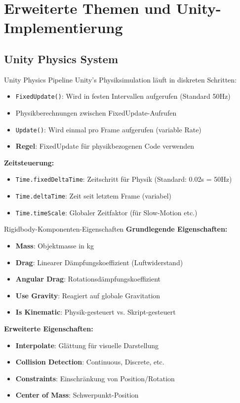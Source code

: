 \section{Erweiterte Themen und Unity-Implementierung}

\subsection{Unity Physics System}

\begin{concept}{Unity Physics Pipeline}
    Unity's Physiksimulation läuft in diskreten Schritten:
    \begin{itemize}
        \item \texttt{FixedUpdate()}: Wird in festen Intervallen aufgerufen (Standard 50Hz)
        \item Physikberechnungen zwischen FixedUpdate-Aufrufen
        \item \texttt{Update()}: Wird einmal pro Frame aufgerufen (variable Rate)
        \item \textbf{Regel}: FixedUpdate für physikbezogenen Code verwenden
    \end{itemize}
    
    \textbf{Zeitsteuerung:}
    \begin{itemize}
        \item \texttt{Time.fixedDeltaTime}: Zeitschritt für Physik (Standard: 0.02s = 50Hz)
        \item \texttt{Time.deltaTime}: Zeit seit letztem Frame (variabel)
        \item \texttt{Time.timeScale}: Globaler Zeitfaktor (für Slow-Motion etc.)
    \end{itemize}
\end{concept}

\begin{definition}{Rigidbody-Komponenten-Eigenschaften}
    \textbf{Grundlegende Eigenschaften:}
    \begin{itemize}
        \item \textbf{Mass}: Objektmasse in kg
        \item \textbf{Drag}: Linearer Dämpfungskoeffizient (Luftwiderstand)
        \item \textbf{Angular Drag}: Rotationsdämpfungskoeffizient
        \item \textbf{Use Gravity}: Reagiert auf globale Gravitation
        \item \textbf{Is Kinematic}: Physik-gesteuert vs. Skript-gesteuert
    \end{itemize}
    
    \textbf{Erweiterte Eigenschaften:}
    \begin{itemize}
        \item \textbf{Interpolate}: Glättung für visuelle Darstellung
        \item \textbf{Collision Detection}: Continuous, Discrete, etc.
        \item \textbf{Constraints}: Einschränkung von Position/Rotation
        \item \textbf{Center of Mass}: Schwerpunkt-Position
    \end{itemize}
\end{definition}

